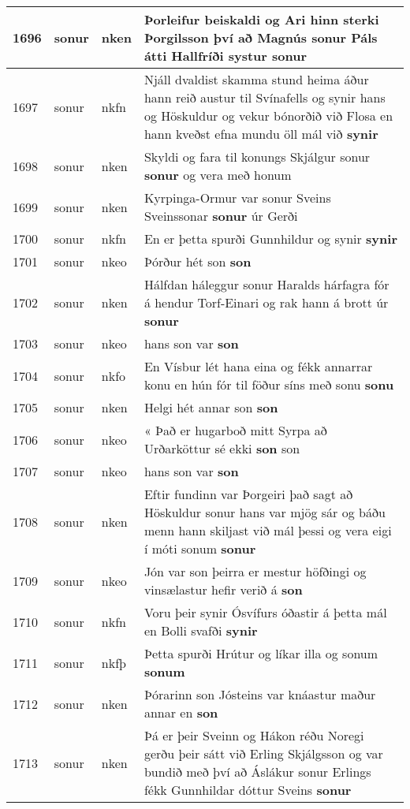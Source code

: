 \documentclass{article}
\begin{document}
\begin{longtable}{p{1cm}|p{1cm}|p{1cm}|p{13cm}}
\hline
1696&sonur&nken&Þorleifur beiskaldi og Ari hinn sterki Þorgilsson því að Magnús sonur Páls átti Hallfríði systur \textbf{sonur} \\
\hline
1697&sonur&nkfn&Njáll dvaldist skamma stund heima áður hann reið austur til Svínafells og synir hans og Höskuldur og vekur bónorðið við Flosa en hann kveðst efna mundu öll mál við \textbf{synir} \\
\hline
1698&sonur&nken&Skyldi og fara til konungs Skjálgur sonur \textbf{sonur} og vera með honum\\
\hline
1699&sonur&nken&Kyrpinga-Ormur var sonur Sveins Sveinssonar \textbf{sonur} úr Gerði\\
\hline
1700&sonur&nkfn&En er þetta spurði Gunnhildur og synir \textbf{synir} \\
\hline
1701&sonur&nkeo&Þórður hét son \textbf{son} \\
\hline
1702&sonur&nken&Hálfdan háleggur sonur Haralds hárfagra fór á hendur Torf-Einari og rak hann á brott úr \textbf{sonur} \\
\hline
1703&sonur&nkeo&hans son var \textbf{son} \\
\hline
1704&sonur&nkfo&En Vísbur lét hana eina og fékk annarrar konu en hún fór til föður síns með sonu \textbf{sonu} \\
\hline
1705&sonur&nken&Helgi hét annar son \textbf{son} \\
\hline
1706&sonur&nkeo&« Það er hugarboð mitt Syrpa að Urðarköttur sé ekki \textbf{son} son\\
\hline
1707&sonur&nkeo&hans son var \textbf{son} \\
\hline
1708&sonur&nken&Eftir fundinn var Þorgeiri það sagt að Höskuldur sonur hans var mjög sár og báðu menn hann skiljast við mál þessi og vera eigi í móti sonum \textbf{sonur} \\
\hline
1709&sonur&nkeo&Jón var son þeirra er mestur höfðingi og vinsælastur hefir verið á \textbf{son} \\
\hline
1710&sonur&nkfn&Voru þeir synir Ósvífurs óðastir á þetta mál en Bolli svafði \textbf{synir} \\
\hline
1711&sonur&nkfþ&Þetta spurði Hrútur og líkar illa og sonum \textbf{sonum} \\
\hline
1712&sonur&nken&Þórarinn son Jósteins var knáastur maður annar en \textbf{son} \\
\hline
1713&sonur&nken&Þá er þeir Sveinn og Hákon réðu Noregi gerðu þeir sátt við Erling Skjálgsson og var bundið með því að Áslákur sonur Erlings fékk Gunnhildar dóttur Sveins \textbf{sonur} \\

\end{longtable}
\end{document}
